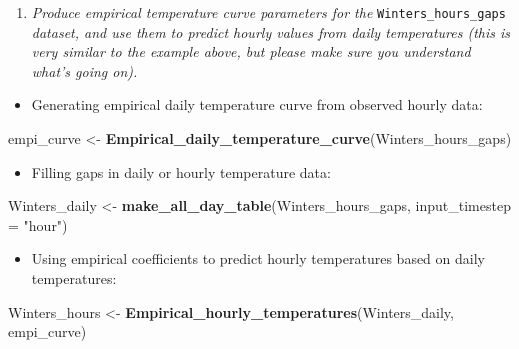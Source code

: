 \documentclass[
]{article}
\newenvironment{Shaded}{\begin{snugshade}}{\end{snugshade}}
\newcommand{\AttributeTok}[1]{\textcolor[rgb]{0.13,0.29,0.53}{#1}}
\newcommand{\FunctionTok}[1]{\textcolor[rgb]{0.13,0.29,0.53}{\textbf{#1}}}
\newcommand{\NormalTok}[1]{#1}
\newcommand{\OtherTok}[1]{\textcolor[rgb]{0.56,0.35,0.01}{#1}}
\newcommand{\StringTok}[1]{\textcolor[rgb]{0.31,0.60,0.02}{#1}}
\providecommand{\tightlist}{%
  \setlength{\itemsep}{0pt}\setlength{\parskip}{0pt}}
\begin{document}
\begin{enumerate}
\def\labelenumi{\arabic{enumi}.}
\setcounter{enumi}{2}
\tightlist
\item
  \emph{Produce empirical temperature curve parameters for the} \texttt{Winters\_hours\_gaps} \emph{dataset, and use them to predict hourly values from daily temperatures (this is very similar to the example above, but please make sure you understand what's going on).}
\end{enumerate}

\begin{itemize}
\tightlist
\item
  Generating empirical daily temperature curve from observed hourly data:
\end{itemize}

\begin{Shaded}
\begin{Highlighting}[]
\NormalTok{empi\_curve }\OtherTok{\textless{}{-}} \FunctionTok{Empirical\_daily\_temperature\_curve}\NormalTok{(Winters\_hours\_gaps)}
\end{Highlighting}
\end{Shaded}

\begin{itemize}
\tightlist
\item
  Filling gaps in daily or hourly temperature data:
\end{itemize}

\begin{Shaded}
\begin{Highlighting}[]
\NormalTok{Winters\_daily }\OtherTok{\textless{}{-}} \FunctionTok{make\_all\_day\_table}\NormalTok{(Winters\_hours\_gaps, }\AttributeTok{input\_timestep =} \StringTok{"hour"}\NormalTok{)}
\end{Highlighting}
\end{Shaded}

\begin{itemize}
\tightlist
\item
  Using empirical coefficients to predict hourly temperatures based on daily temperatures:
\end{itemize}

\begin{Shaded}
\begin{Highlighting}[]
\NormalTok{Winters\_hours }\OtherTok{\textless{}{-}} \FunctionTok{Empirical\_hourly\_temperatures}\NormalTok{(Winters\_daily, empi\_curve)}
\end{Highlighting}
\end{Shaded}
\end{document}
